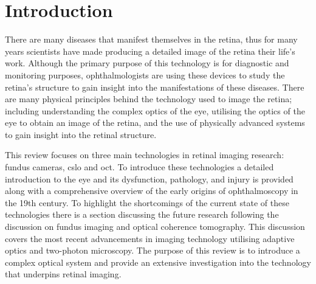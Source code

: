 \chapter{Introduction}

\label{intro}

There are many diseases that manifest themselves  in the  retina, thus
for many years scientists have made producing a detailed image of the
retina their life's work.  Although the primary  purpose of this technology
is for diagnostic and monitoring purposes, ophthalmologists are using
these devices to study the retina's structure to gain insight into the
manifestations of these diseases.  There are many physical principles
behind the technology used to image the retina; including understanding
the complex optics of the eye, utilising the optics of the eye to obtain an
image of the retina, and the use of physically advanced systems to gain
insight into the retinal structure.

This review focuses on three main technologies in retinal 
imaging research: fundus cameras, \Gls{cslo} and \Gls{oct}.
To introduce these technologies a detailed introduction 
to the eye and its dysfunction, pathology, and injury is provided 
along with a comprehensive overview of the early origins of 
ophthalmoscopy in the 19th century.  To highlight the shortcomings 
of the current state of these technologies there is a section discussing 
the future research following the discussion on fundus imaging and 
optical coherence tomography.  This discussion covers the 
most recent advancements in imaging technology utilising adaptive 
optics and two-photon microscopy.  The purpose of this review is to 
introduce a complex optical system and provide an extensive 
investigation into the technology that underpins retinal imaging.
